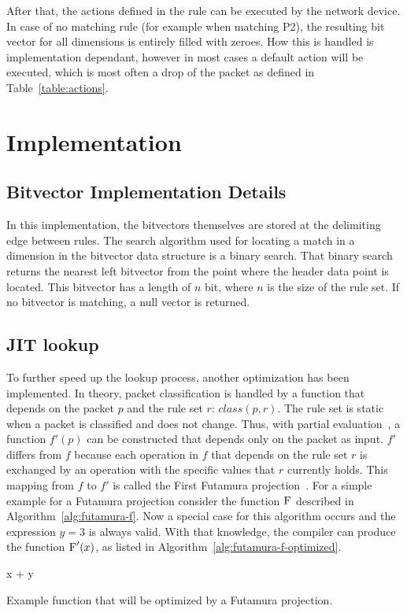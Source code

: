 \documentclass[a4paper,
		12pt,
		parskip=full,
		titlepage
		]{scrartcl}
\begin{document}
After that, the actions defined in the rule can be executed by the network device.
In case of no matching rule (for example when matching P2), the resulting bit vector for all dimensions is entirely filled with zeroes.
How this is handled is implementation dependant, however in most cases a 
default action will be executed, which is most often a drop of the packet as defined in Table~\ref{table:actions}.

\section{Implementation}
\subsection{Bitvector Implementation Details}
In this implementation, the bitvectors themselves are stored at the delimiting edge
between rules.
The search algorithm used for locating a match in a dimension in the bitvector 
data structure is a binary search.
That binary search returns the nearest left bitvector from the point where 
the header data point is located.
This bitvector has a length of $n$ bit, where $n$ is the size of the rule set.
If no bitvector is matching, a null vector is returned.

\subsection{JIT lookup}
To further speed up the lookup process, another optimization has been implemented.
In theory, packet classification is handled by a function that depends on the packet $p$ and the rule set $r$: $class(p, r)$.
The rule set is static when a packet is classified and does not change.
Thus, with partial evaluation~\cite{partial_eval}, a function $f'(p)$ can be constructed that depends only on the packet as input.
$f'$ differs from $f$ because each operation in $f$ that depends on the 
rule set $r$ is exchanged by an operation with the specific values that $r$ currently holds.
This mapping from $f$ to $f'$ is called the First Futamura projection~\cite{DBLP:journals/ngc/MogensenH88}.
For a simple example for a Futamura projection consider the function $\textsc{F}$ described in Algorithm~\ref{alg:futamura-f}.
Now a special case for this algorithm occurs and the expression $y = 3$ is always valid.
With that knowledge, the compiler can produce the function $\textsc{F}'(x)$, as listed in Algorithm~\ref{alg:futamura-f-optimized}.

\begin{algorithm}
\begin{algorithmic}
    \State \Return x + y
\EndFunction
\end{algorithmic}
\caption{Example function that will be optimized by a Futamura projection.}
\label{alg:futamura-f}
\end{algorithm}
\end{document}
